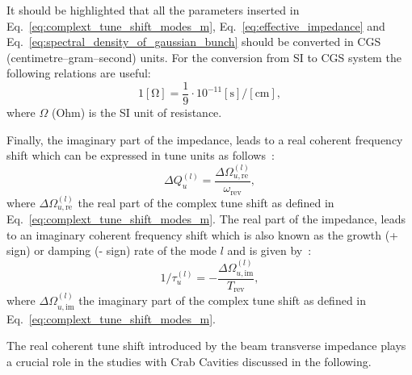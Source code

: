 It should be highlighted that all the parameters inserted in Eq.~\eqref{eq:complext_tune_shift_modes_m},  Eq.~\eqref{eq:effective_impedance} and Eq.~\eqref{eq:spectral_density_of_gaussian_bunch} should be converted in CGS (centimetre–gram–second) units. For the conversion from SI to CGS system the following relations are useful:
\begin{equation}\label{eq:conversion_si_to_cgs}
    1 \mathrm{[\Omega]} = \frac{1}{9} \cdot 10^{-11} \mathrm{[s]/[cm]},
\end{equation}
where $\Omega$ (Ohm) is the SI unit of resistance.



Finally, the imaginary part of the impedance, leads to a real coherent frequency shift which can be expressed in tune units as follows~\cite{PhysRevAccelBeams.23.124402}:
\begin{equation}\label{eq:real_tunu_mode_l}
    \Delta Q_u^{(l)} = \frac{\Delta \Omega_{u, \mathrm{{re}}}^{(l)}}{\omega_\mathrm{rev}},
\end{equation}
where $\Delta \Omega_{u, \mathrm{{re}}}^{(l)}$ the real part of the complex tune shift as defined in Eq.~\eqref{eq:complext_tune_shift_modes_m}.
The real part of the impedance, leads to an imaginary coherent frequency shift which is also known as the growth (+ sign) or damping (- sign) rate of the mode $l$ and is given by~\cite{PhysRevAccelBeams.23.124402}:
\begin{equation}\label{eq:imaginary_tune_mode_l}
    1/\tau_u^{(l)} = -\frac{\Delta \Omega_{u, \mathrm{{im}}}^{(l)}}{T_\mathrm{rev}},
\end{equation}
where $\Delta \Omega_{u, \mathrm{{im}}}^{(l)}$ the imaginary part of the complex tune shift as defined in Eq.~\eqref{eq:complext_tune_shift_modes_m}. %

The real coherent tune shift introduced by the beam transverse impedance plays a crucial role in the studies with Crab Cavities discussed in the following.




